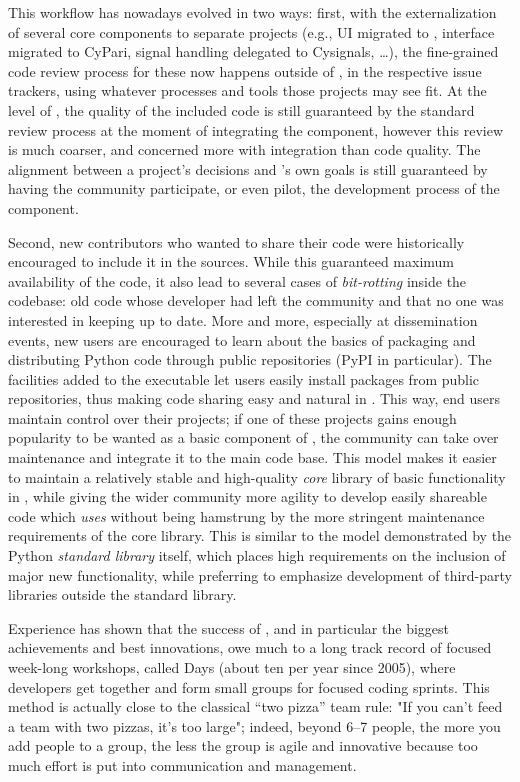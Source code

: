 \documentclass{deliverablereport}
\begin{document}
This workflow has nowadays evolved in two ways: first, with the
externalization of several core components to separate projects (e.g.,
UI migrated to \Jupyter, \PariGP interface migrated to CyPari, signal
handling delegated to Cysignals, \dots), the fine-grained code review
process for these now happens outside of \Sage, in the respective
issue trackers, using whatever processes and tools those projects may see
fit. %
At the level of \Sage, the quality of the included code is still
guaranteed by the standard review process at the moment of integrating
the component, however this review is much coarser, and concerned more
with integration than code quality. %
The alignment between a project's decisions and \Sage's own goals is
still guaranteed by having the \Sage community participate, or even
pilot, the development process of the component.

Second, new \Sage contributors who wanted to share their code were
historically encouraged to include it in the \Sage sources. %
While this guaranteed maximum availability of the code, it also lead
to several cases of \emph{bit-rotting} inside the \Sage codebase: old
code whose developer had left the community and that no one was
interested in keeping up to date. %
More and more, especially at \ODK dissemination events, new users are
encouraged to learn about the basics of packaging and distributing
Python code through public repositories (PyPI in particular). %
The facilities added to the \Sage executable let users easily install
packages from public repositories, thus making code sharing easy and
natural in \Sage. %
This way, end users maintain control over their \Sage projects; if one
of these projects gains enough popularity to be wanted as a basic
component of \Sage, the community can take over maintenance and
integrate it to the main code base.  This model makes it easier to
maintain a relatively stable and high-quality \emph{core} library of
basic functionality in \Sage, while giving the wider community more
agility to develop easily shareable code which \emph{uses} \Sage
without being hamstrung by the more stringent maintenance requirements
of the core library.  This is similar to the model demonstrated by the
Python \emph{standard library} itself, which places high requirements
on the inclusion of major new functionality, while preferring to
emphasize development of third-party libraries outside the standard
library. %

Experience has shown that the success of \Sage, and in particular the
biggest achievements and best innovations, owe much to a long track record of
focused week-long workshops, called \Sage Days (about ten per year
since 2005), where developers get together and form small groups for
focused coding sprints. This method is actually close to the classical
``two pizza'' team rule: "If you can't feed a team with two pizzas, it's too large";
indeed, beyond 6--7 people, the more you add people to a group,
the less the group is agile and innovative because too much effort is
put into communication and management.
\end{document}
